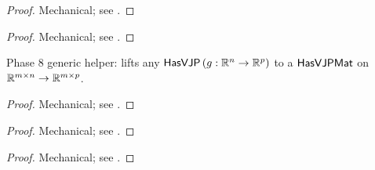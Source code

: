 \begin{theorem}
  \label{thm:scalarScale_has_vjp}
  \leanok
\end{theorem}

\begin{proof}
\leanok
Mechanical; see .
\end{proof}

\begin{theorem}
  \label{thm:transpose_has_vjp}
  \leanok
\end{theorem}

\begin{proof}
\leanok
Mechanical; see .
\end{proof}

\begin{theorem}
  \label{thm:rowwise_has_vjp_mat}
  \leanok
  Phase 8 generic helper: lifts any \(\mathsf{HasVJP}\, (g : \mathbb{R}^{n} \to \mathbb{R}^{p})\)
  to a \(\mathsf{HasVJPMat}\) on \(\mathbb{R}^{m \times n} \to \mathbb{R}^{m \times p}\).
\end{theorem}

\begin{proof}
\leanok
Mechanical; see .
\end{proof}

\begin{theorem}
  \label{thm:pdiv3_comp}
  \leanok
\end{theorem}

\begin{proof}
\leanok
Mechanical; see .
\end{proof}

\begin{theorem}
  \label{thm:vjp3_comp}
  \leanok
\end{theorem}

\begin{proof}
\leanok
Mechanical; see .
\end{proof}

\begin{theorem}
  \label{thm:biPath3_has_vjp}
  \leanok
\end{theorem}

